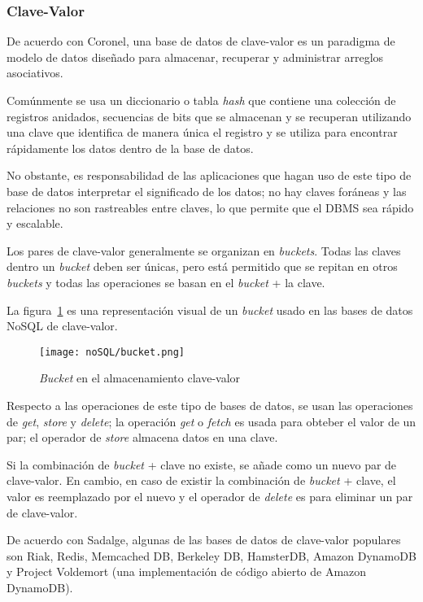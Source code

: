 \subsubsection{Clave-Valor}
De acuerdo con Coronel\cite{coronel_database_nodate}, una base de datos de clave-valor es un paradigma de modelo de datos diseñado para almacenar, recuperar y administrar arreglos asociativos.


Comúnmente se usa un diccionario o tabla \textit{hash} que contiene una colección de registros anidados, secuencias de bits que se almacenan y se recuperan utilizando una clave que identifica de manera única el registro y se utiliza para encontrar rápidamente los datos dentro de la base de datos.


No obstante, es responsabilidad de las aplicaciones que hagan uso de este tipo de base de datos interpretar el significado de los datos; no hay claves foráneas y las relaciones no son rastreables entre claves, lo que permite que el DBMS sea rápido y escalable.


Los pares de clave-valor generalmente se organizan en \textit{buckets}. Todas las claves dentro un \textit{bucket} deben ser únicas, pero está permitido que se repitan en otros \textit{buckets} y todas las operaciones se basan en el \textit{bucket} + la clave.


La figura~\ref{img:claveValor-bucket} es una representación visual de un \textit{bucket} usado en las bases de datos NoSQL de clave-valor.

\begin{figure}[H]
    \centering
    \texttt{[image: noSQL/bucket.png]}
    \caption{\textit{Bucket} en el almacenamiento clave-valor}
    \label{img:claveValor-bucket}
\end{figure} 


Respecto a las operaciones de este tipo de bases de datos, se usan las operaciones de \textit{get}, \textit{store} y \textit{delete}; la operación \textit{get} o \textit{fetch} es usada para obteber el valor de un par; el operador de \textit{store} almacena datos en una clave. 


Si la combinación de \textit{bucket} + clave no existe, se añade como un nuevo par de clave-valor. En cambio, en caso de existir la combinación de \textit{bucket} + clave, el valor es reemplazado por el nuevo y el operador de \textit{delete} es para eliminar un par de clave-valor.


De acuerdo con Sadalge\cite{sadalage_nosql_nodate}, algunas de las bases de datos de clave-valor populares son Riak, Redis, Memcached DB, Berkeley DB, HamsterDB, Amazon DynamoDB y Project Voldemort (una implementación de código abierto de Amazon DynamoDB).


